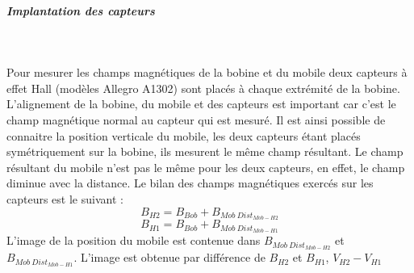 \documentclass[11pt, french]{article} %
\begin{document}
\subparagraph*{Implantation des capteurs}~\\
\begin{minipage}[t]{10cm}
Pour mesurer les champs magnétiques de la bobine et du mobile deux capteurs à effet Hall (modèles Allegro A1302) sont placés à chaque extrémité de la bobine. L'alignement de la bobine, du mobile et des capteurs est important car c'est le champ magnétique normal au capteur qui est mesuré. Il est ainsi possible de connaitre la position verticale du mobile, les deux capteurs étant placés symétriquement sur la bobine, ils mesurent le même champ résultant. Le champ résultant du mobile n'est pas le même pour les deux capteurs, en effet, le champ diminue avec la distance. Le bilan des champs magnétiques exercés sur les capteurs est le suivant :
\vspace{-0.3cm} \[B_{H2} = B_{Bob} + B_{Mob~Dist_{Mob-H2}}\]
\vspace{-0.8cm} \[B_{H1} = B_{Bob} + B_{Mob~Dist_{Mob-H1}}\]
L'image de la position du mobile est contenue dans  $B_{Mob~Dist_{Mob-H2}}$ et $B_{Mob~Dist_{Mob-H1}}$. L'image est obtenue par différence de $B_{H2}$ et $B_{H1}$, $V_{H2}-V_{H1}$
\end{minipage}
~
\begin{minipage}[t]{8cm}
\vspace{-7cm}
\end{minipage}
\end{document}
